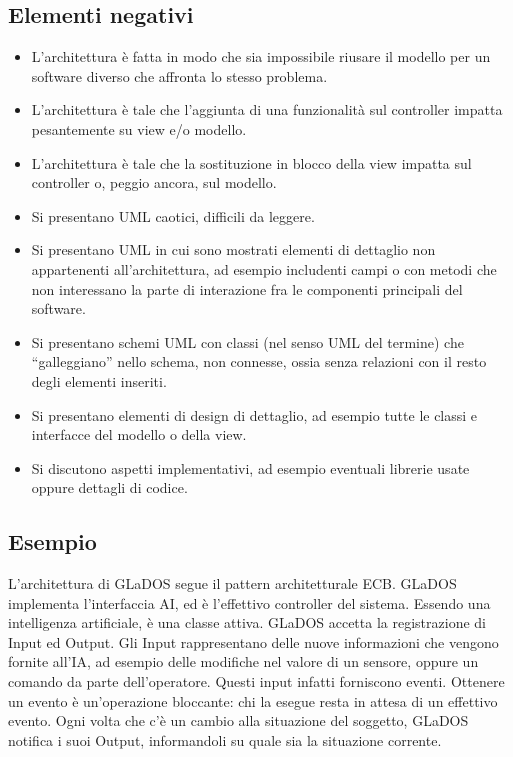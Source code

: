 \documentclass[a4paper,12pt]{report}
\begin{document}
\subsection*{Elementi negativi}
\begin{itemize}
 \item L'architettura è fatta in modo che sia impossibile riusare il modello per un software diverso che affronta lo stesso problema.
 \item L'architettura è tale che l'aggiunta di una funzionalità sul controller impatta pesantemente su view e/o modello.
 \item L'architettura è tale che la sostituzione in blocco della view impatta sul controller o, peggio ancora, sul modello.
 \item Si presentano UML caotici, difficili da leggere.
 \item Si presentano UML in cui sono mostrati elementi di dettaglio non appartenenti all'architettura, ad esempio includenti campi o con metodi che non interessano la parte di interazione fra le componenti principali del software.
 \item Si presentano schemi UML con classi (nel senso UML del termine) che ``galleggiano'' nello schema, non connesse, ossia senza relazioni con il resto degli elementi inseriti.
 \item Si presentano elementi di design di dettaglio, ad esempio tutte le classi e interfacce del modello o della view.
 \item Si discutono aspetti implementativi, ad esempio eventuali librerie usate oppure dettagli di codice.
\end{itemize}

\subsection*{Esempio}
L'architettura di GLaDOS segue il pattern architetturale ECB.
GLaDOS implementa l'interfaccia AI, ed è l'effettivo controller del sistema.
Essendo una intelligenza artificiale, è una classe attiva.
GLaDOS accetta la registrazione di Input ed Output.
Gli Input rappresentano delle nuove informazioni che vengono fornite all'IA, ad esempio delle modifiche nel valore di un sensore, oppure un comando da parte dell'operatore.
Questi input infatti forniscono eventi.
Ottenere un evento è un'operazione bloccante: chi la esegue resta in attesa di un effettivo evento.
Ogni volta che c'è un cambio alla situazione del soggetto, GLaDOS notifica i suoi Output, informandoli su quale sia la situazione corrente.
\end{document}
